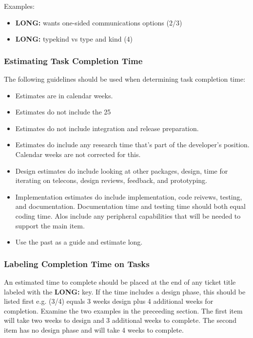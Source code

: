 \vspace{5mm}
Examples:
\begin{itemize}
\item  {\bf LONG:} wants one-sided communications options (2/3) 
\item  {\bf LONG:} typekind vs type and kind (4)
\end{itemize}

\subsubsection{Estimating Task Completion Time}

The following guidelines should be used when determining task completion time:
\begin{itemize}

\item Estimates are in calendar weeks.
\item Estimates do not include the 25%
\item Estimates do not include integration and release preparation.
\item Estimates do include any research time that's part of the developer's position. Calendar weeks are not corrected for this.
\item Design estimates do include looking at other packages, design, time for iterating on telecons, design reviews, feedback, and prototyping.
\item Implementation estimates do include implementation, code reivews, testing, and documentation. Documentation time and testing time should both
equal coding time. Alos include any peripheral capabilities that will be needed to support the main item.
\item Use the past as a guide and estimate long.
\end {itemize}

\subsubsection{Labeling Completion Time on Tasks}

An estimated time to complete should be placed at the end of any ticket title labeled with the {\bf LONG:} key. If the time includes a design phase,
this should be listed first e.g. (3/4) equals 3 weeks design plus 4 additional weeks for completion. Examine the two examples in the preceeding section. 
The first item will take two weeks to design and 3 additional weeks to complete. The second item has no design phase and will take 4 weeks to complete. 

